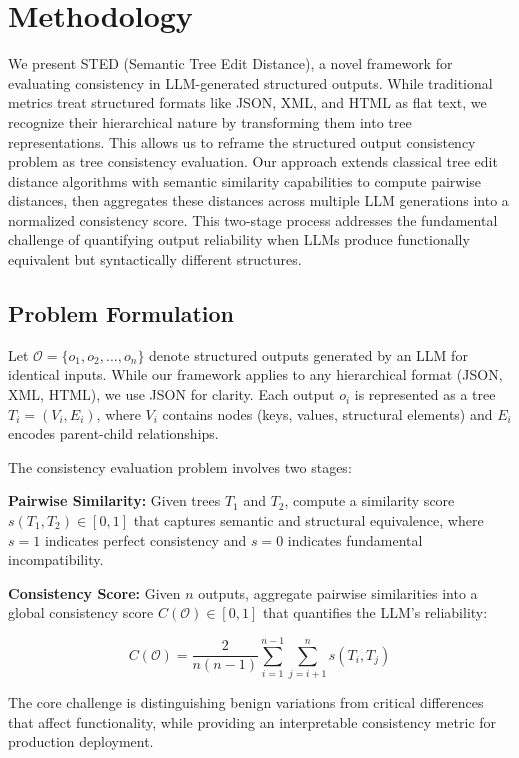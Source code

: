 \documentclass{article}
\begin{document}
\section{Methodology}
\vspace{-3mm}
We present STED (Semantic Tree Edit Distance), a novel framework for evaluating consistency in LLM-generated structured outputs. While traditional metrics treat structured formats like JSON, XML, and HTML as flat text, we recognize their hierarchical nature by transforming them into tree representations. This allows us to reframe the structured output consistency problem as tree consistency evaluation. Our approach extends classical tree edit distance algorithms with semantic similarity capabilities to compute pairwise distances, then aggregates these distances across multiple LLM generations into a normalized consistency score. This two-stage process addresses the fundamental challenge of quantifying output reliability when LLMs produce functionally equivalent but syntactically different structures.

\subsection{Problem Formulation}

Let $\mathcal{O} = \{o_1, o_2, ..., o_n\}$ denote structured outputs generated by an LLM for identical inputs. While our framework applies to any hierarchical format (JSON, XML, HTML), we use JSON for clarity. Each output $o_i$ is represented as a tree $T_i = (V_i, E_i)$, where $V_i$ contains nodes (keys, values, structural elements) and $E_i$ encodes parent-child relationships.

The consistency evaluation problem involves two stages:

\textbf{Pairwise Similarity:} Given trees $T_1$ and $T_2$, compute a similarity score $s(T_1, T_2) \in [0, 1]$ that captures semantic and structural equivalence, where $s = 1$ indicates perfect consistency and $s = 0$ indicates fundamental incompatibility.

\textbf{Consistency Score:} Given $n$ outputs, aggregate pairwise similarities into a global consistency score $C(\mathcal{O}) \in [0, 1]$ that quantifies the LLM's reliability:

\begin{equation}
C(\mathcal{O}) = \frac{2}{n(n-1)} \sum_{i=1}^{n-1} \sum_{j=i+1}^{n} s(T_i, T_j)
\end{equation}

The core challenge is distinguishing benign variations from critical differences that affect functionality, while providing an interpretable consistency metric for production deployment.
\end{document}
